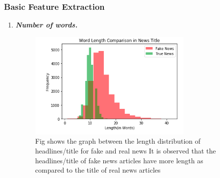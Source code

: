 \documentclass[runningheads]{llncs}
\begin{document}
\subsubsection{Basic Feature Extraction}
\begin{enumerate}
\item \textbf{\emph{Number of words.}}
\begin{figure}
\centering
\includegraphics[width=8cm]{wordLenTitle.png}
\caption{Fig shows the graph between the length distribution of headlines/title for fake and real news It is observed that the headlines/title of fake news articles have more length as compared to the title of real news articles} \label{fig1}
\end{figure}


\end{enumerate}
\end{document}
